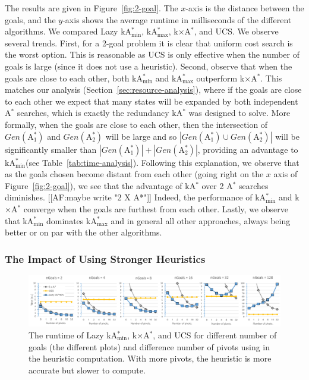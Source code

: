 \documentclass[twoside,11pt]{article}
\newcommand{\astar}{A$^*$\xspace}
\newcommand{\kastar}{kA$^*$\xspace}
\newcommand{\kastarvar}[1]{\textup{kA}$^*_{#1}$\xspace}
\newcommand{\kastarmin}{\kastarvar{\min}}
\newcommand{\kastarmax}{\kastarvar{\max}}
\newcommand{\kxastar}{k$\times$A$^*$\xspace}
\newcommand{\astari}[1]{A$^*_{#1}$\xspace}
\begin{document}
The results are given in Figure~\ref{fig:2-goal}.
The $x$-axis is the distance between the goals, and the $y$-axis shows the average runtime in milliseconds of the different algorithms.
We compared Lazy \kastarmin, \kastarmax, \kxastar, and UCS.
We observe several trends.
First, for a 2-goal problem it is clear that uniform cost search is the worst option.
This is reasonable as UCS is only effective when the number of goals is large (since it does not use a heuristic).
Second, observe that when the goals are close to each other, both \kastarmin and \kastarmax outperform \kxastar.
This matches our analysis (Section~\ref{sec:resource-analysis}), where if the goals are close to each other we expect that many states will be expanded by both independent \astar searches, which is  exactly the redundancy \kastar was designed to solve.
More formally, when the goals are close to each other, then the intersection of $Gen(\text{\astari{1}})$ and $Gen(\text{\astari{2}})$ will be large and so $|Gen(\text{\astari{1}})\cup Gen(\text{\astari{2}})|$ will be significantly smaller than $|Gen(\text{\astari{1}})|+|Gen(\text{\astari{2}})|$, providing an advantage to \kastarmin (see Table~\ref{tab:time-analysis}).
Following this explanation, we observe that as the goals chosen become distant from each other (going right on the $x$ axis of Figure~\ref{fig:2-goal}), we see that the advantage of \kastar over 2 \astar searches diminishes.  [[AF:maybe write  "2 X A*"]]
Indeed, the performance of \kastarmin and \kxastar converge when the goals are furthest from each other.
Lastly, we observe that \kastarmin dominates \kastarmax and in general all other approaches, always being better or on par with the other algorithms.

\subsubsection{The Impact of Using Stronger Heuristics}

\begin{figure}
  \includegraphics[width=\textwidth]{heuristic-power_cropped.pdf}
\caption{The runtime of Lazy \kastarmin, \kxastar, and UCS for different number of goals (the different plots) and difference number of pivots using in the heuristic computation.
With more pivots, the heuristic is more accurate but slower to compute.}
  \label{fig:dh-results}
\end{figure}
\end{document}
